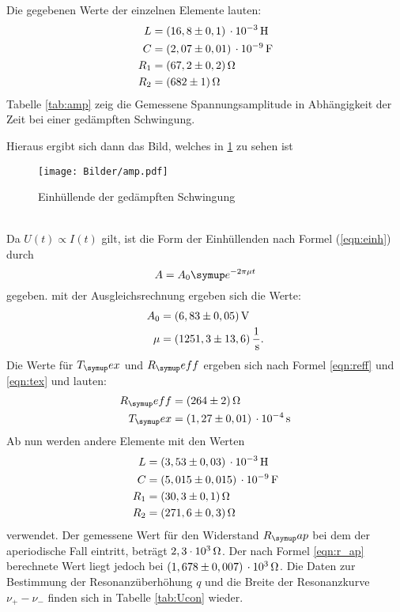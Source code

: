 Die gegebenen Werte der einzelnen Elemente lauten:
\begin{align*}
  L &= (16,8 \pm 0,1) \,\cdot 10^{-3}\Hen \\
  C &= (2,07 \pm 0,01) \,\cdot 10^{-9} \Far \\
  R_1 &= (67,2 \pm 0,2) \Ohm \\
  R_2 &= (682 \pm 1) \Ohm
\end{align*}
Tabelle \ref{tab:amp} zeig die Gemessene Spannungsamplitude in Abhängigkeit der Zeit bei
einer gedämpften Schwingung.

Hieraus ergibt sich dann das Bild, welches in \ref{fig:AMP} zu sehen ist
\begin{figure}[h]
  \centering
  \texttt{[image: Bilder/amp.pdf]}
  \caption{Einhüllende der gedämpften Schwingung}
  \label{fig:AMP}
\end{figure}
\\
Da $U(t)\propto I(t)$ gilt, ist die Form der Einhüllenden nach Formel
(\ref{eqn:einh}) durch
\begin{equation}
  A = A_0\su{e}^{-2\pi\mu t}
\end{equation}
gegeben.
mit der Ausgleichsrechnung ergeben sich die Werte:
\begin{align*}
  A_0 &= (6,83 \pm 0,05)\,\si{\volt}\\
  \mu &= (1251,3 \pm 13,6)\,\frac{1}{\,\si{\second}}.
\end{align*}
Die Werte für $T_\su{ex}$ und $R_\su{eff}$ ergeben sich nach Formel \eqref{eqn:reff}
und \eqref{eqn:tex} und lauten:
\begin{align*}
  R_\su{eff} &= (264 \pm 2)\Ohm \\ %
  T_\su{ex}  &= (1,27 \pm 0,01)\,\cdot 10^{-4}\sek
\end{align*}
Ab nun werden andere Elemente mit den Werten
\begin{align*}
  L &= (3,53 \pm 0,03) \,\cdot 10^{-3}\Hen \\
  C &= (5,015 \pm 0,015) \,\cdot 10^{-9} \Far \\
  R_1 &= (30,3 \pm 0,1) \Ohm \\
  R_2 &= (271,6 \pm 0,3) \Ohm
\end{align*}
verwendet.
Der gemessene Wert für den Widerstand $R_\su{ap}$ bei dem der aperiodische Fall
eintritt, beträgt $2,3\cdot 10^3 \,\si{\ohm}$. Der nach Formel \eqref{eqn:r_ap}
berechnete Wert liegt jedoch bei $(1,678 \pm 0,007)\,\cdot 10^3\,\si{\ohm}$.
Die Daten zur Bestimmung der Resonanzüberhöhung $q$ und die Breite der
Resonanzkurve $\nu_+ - \nu_-$ finden sich in Tabelle \ref{tab:Ucon} wieder.
